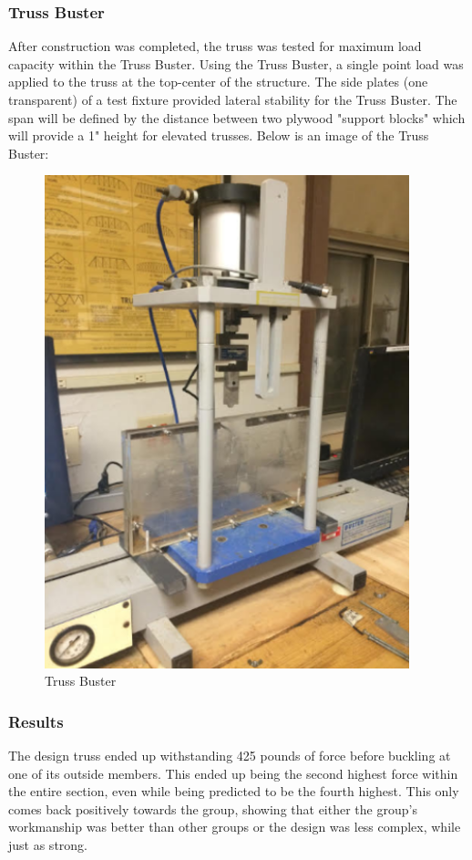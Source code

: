 \documentclass{article}
\begin{document}
\subsubsection{Truss Buster}
After construction was completed, the truss was tested for maximum load capacity within the Truss Buster. Using the Truss Buster, a single point load was applied to the truss at the top-center of the structure. The side plates (one transparent) of a test fixture provided lateral stability for the Truss Buster. The span will be defined by the distance between two plywood "support blocks" which will provide a 1" height for elevated trusses. Below is an image of the Truss Buster:

\begin{figure}[ht]
\caption{Truss Buster}
\centering
\includegraphics[width=300pt]{TrussBuster.png}
\end{figure}

\newpage

\subsubsection{Results}
The design truss ended up withstanding 425 pounds of force before buckling at one of its outside members. This ended up being the second highest force within the entire section, even while being predicted to be the fourth highest. This only comes back positively towards the group, showing that either the group's workmanship was better than other groups or the design was less complex, while just as strong. 
\end{document}
